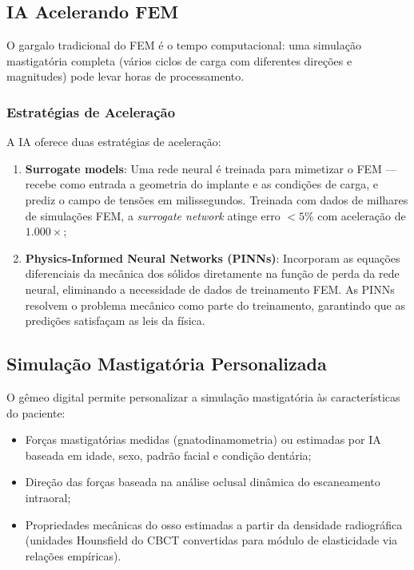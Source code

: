 \subsection{IA Acelerando FEM}

O gargalo tradicional do FEM é o tempo computacional: uma simulação mastigatória completa (vários ciclos de carga com diferentes direções e magnitudes) pode levar horas de processamento.

\subsubsection{Estratégias de Aceleração}

A IA oferece duas estratégias de aceleração:

\begin{enumerate}
    \item \textbf{Surrogate models}: Uma rede neural é treinada para mimetizar o FEM --- recebe como entrada a geometria do implante e as condições de carga, e prediz o campo de tensões em milissegundos. Treinada com dados de milhares de simulações FEM, a \textit{surrogate network} atinge erro $< 5\%$ com aceleração de $1.000\times$;
    
    \item \textbf{Physics-Informed Neural Networks (PINNs)}: Incorporam as equações diferenciais da mecânica dos sólidos diretamente na função de perda da rede neural, eliminando a necessidade de dados de treinamento FEM. As PINNs resolvem o problema mecânico como parte do treinamento, garantindo que as predições satisfaçam as leis da física.
\end{enumerate}

\subsection{Simulação Mastigatória Personalizada}

O gêmeo digital permite personalizar a simulação mastigatória às características do paciente:
\begin{itemize}
    \item Forças mastigatórias medidas (gnatodinamometria) ou estimadas por IA baseada em idade, sexo, padrão facial e condição dentária;
    \item Direção das forças baseada na análise oclusal dinâmica do escaneamento intraoral;
    \item Propriedades mecânicas do osso estimadas a partir da densidade radiográfica (unidades Hounsfield do CBCT convertidas para módulo de elasticidade via relações empíricas).
\end{itemize}

